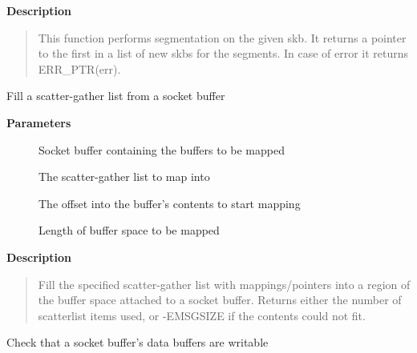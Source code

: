 \documentclass[a4paper,8pt,english]{sphinxmanual}
\begin{document}
\textbf{Description}
\begin{quote}

This function performs segmentation on the given skb.  It returns
a pointer to the first in a list of new skbs for the segments.
In case of error it returns ERR\_PTR(err).
\end{quote}

\begin{fulllineitems}
\label{networking/kapi:c.skb_to_sgvec}
Fill a scatter-gather list from a socket buffer

\end{fulllineitems}


\textbf{Parameters}
\begin{description}
\item[{}] \leavevmode
Socket buffer containing the buffers to be mapped

\item[{}] \leavevmode
The scatter-gather list to map into

\item[{}] \leavevmode
The offset into the buffer's contents to start mapping

\item[{}] \leavevmode
Length of buffer space to be mapped

\end{description}

\textbf{Description}
\begin{quote}

Fill the specified scatter-gather list with mappings/pointers into a
region of the buffer space attached to a socket buffer. Returns either
the number of scatterlist items used, or -EMSGSIZE if the contents
could not fit.
\end{quote}

\begin{fulllineitems}
\label{networking/kapi:c.skb_cow_data}
Check that a socket buffer's data buffers are writable

\end{fulllineitems}
\end{document}
